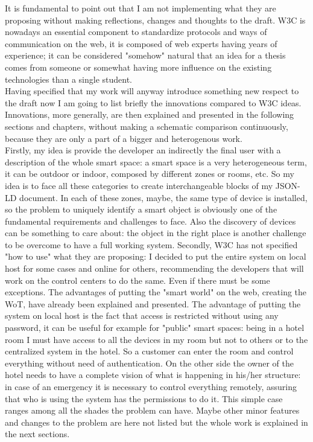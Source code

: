 It is fundamental to point out that I am not implementing what they are proposing without making reflections, changes and thoughts to the draft. W3C is nowadays an essential component to standardize protocols and ways of communication on the web, it is composed of web experts having years of experience; it can be considered "somehow" natural that an idea for a thesis comes from someone or somewhat having more influence on the existing technologies than a single student. \\
Having specified that my work will anyway introduce something new respect to the draft now I am going to list briefly the innovations compared to W3C ideas. Innovations, more generally, are then explained and presented in the following sections and chapters, without making a schematic comparison continuously, because they are only a part of a bigger and heterogenous work. \\
Firstly, my idea is provide the developer an indirectly the final user with a description of the whole smart space: a smart space is a very heterogeneous term, it can be outdoor or indoor, composed by different zones or rooms, etc. So my idea is to face all these categories to create interchangeable blocks of my JSON-LD document. In each of these zones, maybe, the same type of device is installed, so the problem to uniquely identify a smart object is obviously one of the fundamental requirements and challenges to face. Also the discovery of devices can be something to care about: the object in the right place is another challenge to be overcome to have a full working system. Secondly, W3C has not specified "how to use" what they are proposing: I decided to put the entire system on local host for some cases and online for others, recommending the developers that will work on the control centers to do the same. Even if there must be some exceptions. The advantages of putting the "smart world" on the web, creating the WoT, have already been explained and presented. The advantage of putting the system on local host is the fact that access is restricted without using any password, it can be useful for example for "public" smart spaces: being in a hotel room I must have access to all the devices in my room but not to others or to the centralized system in the hotel. So a customer can enter the room and control everything without need of authentication. On the other side the owner of the hotel needs to have a complete vision of what is happening in his/her structure: in case of an emergency it is necessary to control everything remotely, assuring that who is using the system has the permissions to do it. This simple case ranges among all the shades the problem can have. Maybe other minor features and changes to the problem are here not listed but the whole work is explained in the next sections.

